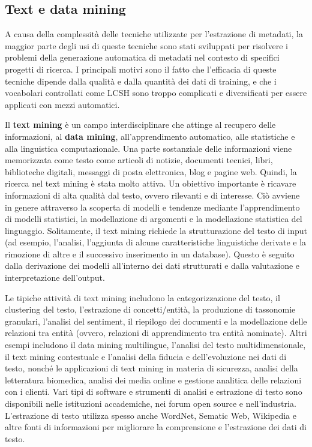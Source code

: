 \subsection{Text e data mining}
A causa della complessità delle tecniche utilizzate per l'estrazione di metadati, la maggior parte degli usi di queste tecniche sono stati sviluppati per risolvere i problemi della generazione automatica di metadati nel contesto di specifici progetti di ricerca.
I principali motivi sono il fatto che l'efficacia di queste tecniche dipende dalla qualità e dalla quantità dei dati di training, e che i vocabolari controllati come LCSH sono troppo complicati e diversificati per essere applicati con mezzi automatici.

Il \textbf{text mining} è un campo interdisciplinare che attinge al recupero delle informazioni, al \textbf{data mining}, all'apprendimento automatico, alle statistiche e alla linguistica computazionale. Una parte sostanziale delle informazioni viene memorizzata come testo come articoli di notizie, documenti tecnici, libri, biblioteche digitali, messaggi di posta elettronica, blog e pagine web. Quindi, la ricerca nel text mining è stata molto attiva. Un obiettivo importante è ricavare informazioni di alta qualità dal testo, ovvero rilevanti e di interesse. Ciò avviene in genere attraverso la scoperta di modelli e tendenze mediante l'apprendimento di modelli statistici, la modellazione di argomenti e la modellazione statistica del linguaggio. Solitamente, il text mining richiede la strutturazione del testo di input (ad esempio, l'analisi, l'aggiunta di alcune caratteristiche linguistiche derivate e la rimozione di altre e il successivo inserimento in un database). Questo è seguito dalla derivazione dei modelli all'interno dei dati strutturati e dalla valutazione e interpretazione dell'output.

Le tipiche attività di text mining includono la categorizzazione del testo, il clustering del testo, l'estrazione di concetti/entità, la produzione di tassonomie granulari, l'analisi del sentiment, il riepilogo dei documenti e la modellazione delle relazioni tra entità (ovvero, relazioni di apprendimento tra entità nominate). Altri esempi includono il data mining multilingue, l'analisi del testo multidimensionale, il text mining contestuale e l'analisi della fiducia e dell'evoluzione nei dati di testo, nonché le applicazioni di text mining in materia di sicurezza, analisi della letteratura biomedica, analisi dei media online e gestione analitica delle relazioni con i clienti. Vari tipi di software e strumenti di analisi e estrazione di testo sono disponibili nelle istituzioni accademiche, nei forum open source e nell'industria. L'estrazione di testo utilizza spesso anche WordNet, Sematic Web, Wikipedia e altre fonti di informazioni per migliorare la comprensione e l'estrazione dei dati di testo.\cite{textmining}

